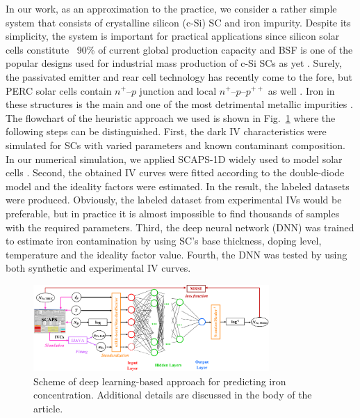 \documentclass[num-refs]{wiley-article} %
\begin{document}
In our work, as an approximation to the practice,
we consider a rather simple system
that consists of crystalline silicon (c-Si) SC  and iron impurity.
Despite its simplicity, the system is important for practical applications
since  silicon solar cells constitute ~90\% of current global production capacity \cite{SCRev2015}
and BSF  is one of  the popular designs used
for industrial mass production of c-Si SCs as yet \cite{SCRev2020,GreenRew2019}.
Surely, the passivated emitter and rear cell technology has
recently come to the fore, but PERC solar cells contain $n^+$--$p$ junction
and local $n^+$--$p$--$p^{++}$ as well \cite{GreenRew2019,WilsonRew2020}.
Iron in these structures is the main and one of the most detrimental metallic impurities \cite{ZHU2016192,FeB:Schmidt,IronSC}.
The flowchart of the heuristic approach we used is shown in Fig.~\ref{fig_chem}
where the following steps can be distinguished.
First, the dark IV characteristics were simulated for SCs with varied parameters
and known contaminant composition.
In our numerical simulation,  we applied SCAPS-1D \cite{SCAPS1,SCAPS2}
widely used to model solar cells \cite{SCAPSuseSi4,SCAPSuseSi1,SCAPSuseSi6,SCAPSuse1,SCAPSuse2020,SCAPSuse2017SM}.
Second, the obtained IV curves were fitted according to the double-diode model
and the ideality factors were estimated.
In the result, the labeled datasets were produced.
Obviously, the labeled dataset from experimental IVs  would be preferable,
but in practice it is almost impossible to find thousands of samples
with the required parameters.
Third, the deep neural network (DNN) was trained to estimate iron contamination
by using SC's base thickness, doping level, temperature and the ideality factor value.
Fourth, the DNN was tested by using both synthetic and experimental IV curves.

\begin{figure}
\centering
\includegraphics[width=0.8\textwidth]{Chem}
\caption{Scheme of deep learning-based approach for predicting iron concentration.
Additional details are discussed in the body of the article.
}
\label{fig_chem}
\end{figure}
\end{document}
